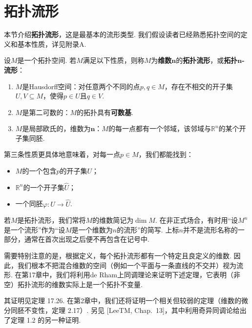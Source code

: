 \section{拓扑流形}

本节介绍\textbf{拓扑流形}，这是最基本的流形类型. 我们假设读者已经熟悉拓扑空间的定义和基本性质，详见附录A.

设$M$是一个拓扑空间. 若$M$满足以下性质，则称$M$为\textbf{维数}$\pmb{n}$的\textbf{拓扑流形}，或\textbf{拓扑$\pmb{n}$-流形}：
\begin{enumerate}
    \item[(i)] $M$是Hausdorff空间：对任意两个不同的点$p,q\in M$，存在不相交的开子集$U,V\subseteq M$，使得$p\in U$且$q\in V$.
    \item[(ii)] $M$是第二可数的：$M$的拓扑具有\textbf{可数基}.
    \item[(iii)] $M$是局部欧氏的，维数为$\pmb{n}$：$M$的每一点都有一个邻域，该邻域与$\mathbb{R}^n$的某个开子集同胚.
\end{enumerate}

第三条性质更具体地意味着，对每一点$p\in M$，我们都能找到：
\begin{itemize}
    \item $M$的一个包含$p$的开子集$U$；
    \item $\mathbb{R}^n$的一个开子集$\hat{U}$；
    \item 一个同胚$\varphi\colon U\to\hat{U}$.
\end{itemize}


若$M$是拓扑流形，我们常将$M$的维数简记为$\dim M$. 在非正式场合，有时用“设$M^n$是一个流形”作为“设$M$是一个维数为$n$的流形”的简写. 上标$n$并不是流形名称的一部分，通常在首次出现之后便不再包含在记号中.

需要特别注意的是，根据定义，每个拓扑流形都有一个特定且良定义的维数. 因此，我们根本不把混合维数的空间（例如一个平面与一条直线的不交并）视为流形. 在第17章中，我们将利用de Rham上同调理论来证明下述定理，它表明（非空）拓扑流形的维数实际上是一个拓扑不变量.


其证明见定理 17.26. 在第2章中，我们还将证明一个相关但较弱的定理（维数的微分同胚不变性，定理 2.17）. 另见 [LeeTM, Chap.~13]，其中利用奇异同调论给出了定理 1.2 的另一种证明.

